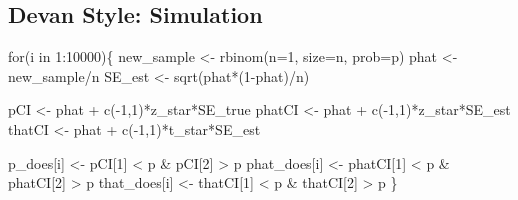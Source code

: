 \documentclass[
  letterpaper,
  DIV=11,
  numbers=noendperiod,
  oneside]{scrreprt}
\newenvironment{Shaded}{\begin{snugshade}}{\end{snugshade}}
\newcommand{\AttributeTok}[1]{\textcolor[rgb]{0.40,0.45,0.13}{#1}}
\newcommand{\ControlFlowTok}[1]{\textcolor[rgb]{0.00,0.23,0.31}{#1}}
\newcommand{\DecValTok}[1]{\textcolor[rgb]{0.68,0.00,0.00}{#1}}
\newcommand{\FunctionTok}[1]{\textcolor[rgb]{0.28,0.35,0.67}{#1}}
\newcommand{\NormalTok}[1]{\textcolor[rgb]{0.00,0.23,0.31}{#1}}
\newcommand{\OtherTok}[1]{\textcolor[rgb]{0.00,0.23,0.31}{#1}}
\newcommand{\SpecialCharTok}[1]{\textcolor[rgb]{0.37,0.37,0.37}{#1}}
\begin{document}
\hypertarget{devan-style-simulation-1}{%
\subsection{Devan Style: Simulation}\label{devan-style-simulation-1}}

\begin{Shaded}
\begin{Highlighting}[]
\ControlFlowTok{for}\NormalTok{(i }\ControlFlowTok{in} \DecValTok{1}\SpecialCharTok{:}\DecValTok{10000}\NormalTok{)\{}
\NormalTok{    new\_sample }\OtherTok{\textless{}{-}} \FunctionTok{rbinom}\NormalTok{(}\AttributeTok{n=}\DecValTok{1}\NormalTok{, }\AttributeTok{size=}\NormalTok{n, }\AttributeTok{prob=}\NormalTok{p)}
\NormalTok{    phat }\OtherTok{\textless{}{-}}\NormalTok{ new\_sample}\SpecialCharTok{/}\NormalTok{n}
\NormalTok{    SE\_est }\OtherTok{\textless{}{-}} \FunctionTok{sqrt}\NormalTok{(phat}\SpecialCharTok{*}\NormalTok{(}\DecValTok{1}\SpecialCharTok{{-}}\NormalTok{phat)}\SpecialCharTok{/}\NormalTok{n)}
    
\NormalTok{    pCI }\OtherTok{\textless{}{-}}\NormalTok{ phat }\SpecialCharTok{+} \FunctionTok{c}\NormalTok{(}\SpecialCharTok{{-}}\DecValTok{1}\NormalTok{,}\DecValTok{1}\NormalTok{)}\SpecialCharTok{*}\NormalTok{z\_star}\SpecialCharTok{*}\NormalTok{SE\_true}
\NormalTok{    phatCI }\OtherTok{\textless{}{-}}\NormalTok{ phat }\SpecialCharTok{+} \FunctionTok{c}\NormalTok{(}\SpecialCharTok{{-}}\DecValTok{1}\NormalTok{,}\DecValTok{1}\NormalTok{)}\SpecialCharTok{*}\NormalTok{z\_star}\SpecialCharTok{*}\NormalTok{SE\_est}
\NormalTok{    thatCI }\OtherTok{\textless{}{-}}\NormalTok{ phat }\SpecialCharTok{+} \FunctionTok{c}\NormalTok{(}\SpecialCharTok{{-}}\DecValTok{1}\NormalTok{,}\DecValTok{1}\NormalTok{)}\SpecialCharTok{*}\NormalTok{t\_star}\SpecialCharTok{*}\NormalTok{SE\_est}
    
\NormalTok{    p\_does[i] }\OtherTok{\textless{}{-}}\NormalTok{ pCI[}\DecValTok{1}\NormalTok{] }\SpecialCharTok{\textless{}}\NormalTok{ p }\SpecialCharTok{\&}\NormalTok{ pCI[}\DecValTok{2}\NormalTok{] }\SpecialCharTok{\textgreater{}}\NormalTok{ p}
\NormalTok{    phat\_does[i] }\OtherTok{\textless{}{-}}\NormalTok{ phatCI[}\DecValTok{1}\NormalTok{] }\SpecialCharTok{\textless{}}\NormalTok{ p }\SpecialCharTok{\&}\NormalTok{ phatCI[}\DecValTok{2}\NormalTok{] }\SpecialCharTok{\textgreater{}}\NormalTok{ p}
\NormalTok{    that\_does[i] }\OtherTok{\textless{}{-}}\NormalTok{ thatCI[}\DecValTok{1}\NormalTok{] }\SpecialCharTok{\textless{}}\NormalTok{ p }\SpecialCharTok{\&}\NormalTok{ thatCI[}\DecValTok{2}\NormalTok{] }\SpecialCharTok{\textgreater{}}\NormalTok{ p}
\NormalTok{\}}
\end{Highlighting}
\end{Shaded}
\end{document}
